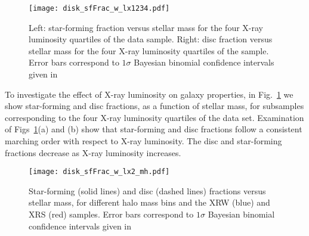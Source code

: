 \begin{figure}[!tp]
  \centering
  \texttt{[image: disk\_sfFrac\_w\_lx1234.pdf]}
  \caption{Left: star-forming fraction versus stellar mass for the
    four X-ray luminosity quartiles of the data sample.  Right: disc
    fraction versus stellar mass for the four X-ray luminosity
    quartiles of the sample.  Error bars correspond to $1\sigma$
    Bayesian binomial confidence intervals given in \citet{cameron2011}}
  \label{fig:disk_sfFrac_w_lx1234}
\end{figure}

To investigate the effect of X-ray luminosity on galaxy properties, in
Fig.~\ref{fig:disk_sfFrac_w_lx1234} we show star-forming and disc
fractions, as a function of stellar mass, for subsamples corresponding
to the four X-ray luminosity quartiles of the data set.  Examination
of Figs~\ref{fig:disk_sfFrac_w_lx1234}(a) and (b) show that
star-forming and disc fractions follow a consistent marching order
with respect to X-ray luminosity.  The disc and star-forming fractions
decrease as X-ray luminosity increases.

\begin{figure}[!tp]
  \centering
  \texttt{[image: disk\_sfFrac\_w\_lx2\_mh.pdf]}
  \caption{Star-forming (solid lines) and disc (dashed lines)
    fractions versus stellar mass, for different halo mass bins and
    the XRW (blue) and XRS (red) samples.  Error bars correspond to
    $1\sigma$ Bayesian binomial confidence intervals given in \citet{cameron2011}}
  \label{fig:disk_sfFrac_w_lx2_mh}
\end{figure}

